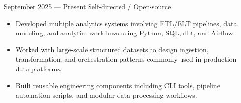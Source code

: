 


{September 2025 --- Present}
{Self-directed / Open-source}
{}
      \begin{itemize}
          \item Developed multiple analytics systems involving ETL/ELT pipelines,
              data modeling, and analytics workflows using Python, SQL, dbt, and Airflow.
          \item Worked with large-scale structured datasets to design ingestion, transformation,
              and orchestration patterns commonly used in production data platforms.
          \item Built reusable engineering components including CLI tools, pipeline automation scripts, and modular data processing workflows.
      \end{itemize}
